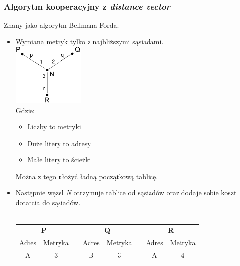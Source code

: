 \documentclass[a4paper,twoside]{article}
\begin{document}
			\subsubsection{Algorytm kooperacyjny z \emph{distance vector}}
				Znany jako algorytm Bellmana-Forda.
				\begin{itemize}
					\item Wymiana metryk tylko z najbliższymi sąsiadami.\\
					\includegraphics[width=3.5cm]{./images/image40.pdf}\\
					Gdzie:
					\begin{itemize}
						\item Liczby to metryki
						\item Duże litery to adresy
						\item Małe litery to ścieżki
					\end{itemize}
					Można z tego ułożyć ładną początkową tablicę.
					\item Następnie węzeł \emph{N} otrzymuje tablice od sąsiadów oraz dodaje sobie koszt dotarcia do sąsiadów.\\\\
					\begin{tabular}{cccccccc}
						\cline{1-2} \cline{4-5} \cline{7-8}
						\multicolumn{2}{|c|}{\textbf{P}}                                    & \multicolumn{1}{c|}{} & \multicolumn{2}{c|}{\textbf{Q}}                                    & \multicolumn{1}{c|}{} & \multicolumn{2}{c|}{\textbf{R}}                                    \\ \cline{1-2} \cline{4-5} \cline{7-8} 
						\multicolumn{1}{|c|}{Adres} & \multicolumn{1}{c|}{Metryka} & \multicolumn{1}{c|}{} & \multicolumn{1}{c|}{Adres} & \multicolumn{1}{c|}{Metryka} & \multicolumn{1}{c|}{} & \multicolumn{1}{c|}{Adres} & \multicolumn{1}{c|}{Metryka} \\ \cline{1-2} \cline{4-5} \cline{7-8} 
						\multicolumn{1}{|c|}{A}     & \multicolumn{1}{c|}{3}       & \multicolumn{1}{c|}{} & \multicolumn{1}{c|}{B}     & \multicolumn{1}{c|}{3}       & \multicolumn{1}{c|}{} & \multicolumn{1}{c|}{A}     & \multicolumn{1}{c|}{4}       \\ \cline{1-2} \cline{4-5} \cline{7-8} 

\end{tabular}
\end{itemize}
\end{document}
